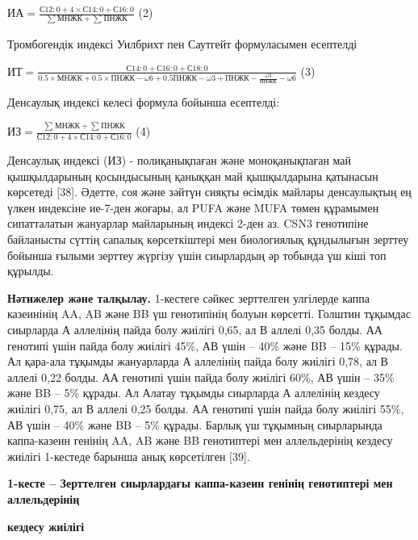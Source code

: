 \(ИА = \frac{С12:0 + 4 \times С14:0 + С16:0}{\sum_{}^{}{МНЖК + \sum_{}^{}{ПНЖК}}}\)
(2)

Тромбогендік индексі Уилбрихт пен Саутгейт формуласымен есептелді

\(ИТ = \frac{С14:0 + С16:0 + С18:0}{0.5 \times МНЖК + 0.5 \times ПНЖК - \omega 6 + 0.5ПНЖК - \omega 3 + ПНЖК - \frac{\omega 3}{ПНЖК} - \omega 6}\)
(3)

Денсаулық индексі келесі формула бойынша есептелді:

\(ИЗ = \frac{\sum_{}^{}{МНЖК + \sum_{}^{}{ПНЖК}}}{С12:0 + 4 \times С14:0 + С16:0}\)
(4)

Денсаулық индексі (ИЗ) - полиқанықпаған және моноқанықпаған май
қышқылдарының қосындысының қаныққан май қышқылдарына қатынасын көрсетеді
{[}38{]}. Әдетте, соя және зәйтүн сияқты өсімдік майлары денсаулықтың ең
үлкен индексіне ие-7-ден жоғары, ал PUFA және MUFA төмен құрамымен
сипатталатын жануарлар майларының индексі 2-ден аз. CSN3 генотипіне
байланысты сүттің сапалық көрсеткіштері мен биологиялық құндылығын
зерттеу бойынша ғылыми зерттеу жүргізу үшін сиырлардың әр тобында үш
кіші топ құрылды.

{\bfseries Нәтижелер және талқылау.} 1-кестеге сәйкес зерттелген улгілерде
каппа казеинінің AA, AB және BB үш генотипінің болуын көрсетті. Голштин
тұқымдас сиырларда А аллелінің пайда болу жиілігі 0,65, ал В аллелі 0,35
болды. АА генотипі үшін пайда болу жиілігі 45\%, АВ үшін -- 40\% және BB
-- 15\% құрады. Ал қара-ала тұқымды жануарларда А аллелінің пайда болу
жиілігі 0,78, ал В аллелі 0,22 болды. АА генотипі үшін пайда болу
жиілігі 60\%, АВ үшін -- 35\% және BB -- 5\% құрады. Ал Алатау тұқымды
сиырларда А аллелінің кездесу жиілігі 0,75, ал В аллелі 0,25 болды. АА
генотипі үшін пайда болу жиілігі 55\%, АВ үшін -- 40\% және BB -- 5\%
құрады. Барлық үш тұқымның сиырларында каппа-казеин генінің AA, AB және
BB генотиптері мен аллельдерінің кездесу жиілігі 1-кестеде барынша анық
көрсетілген {[}39{]}.

{\bfseries 1-кесте -- Зерттелген сиырлардағы каппа-казеин генінің
генотиптері мен аллельдерінің}

{\bfseries кездесу жиілігі}


